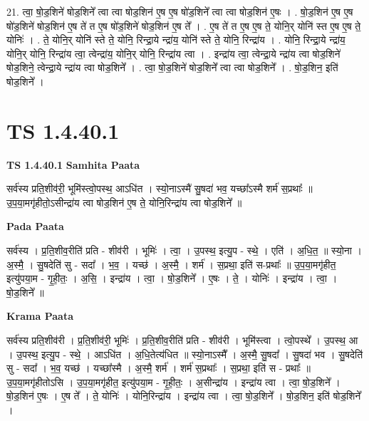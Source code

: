 \documentclass[17pt]{extarticle}
\begin{document}
21. त्वा॒ षो॒ड॒शिने॑ षोड॒शिने᳚ त्वा त्वा षोड॒शिन॑ ए॒ष ए॒ष षो॑ड॒शिने᳚ त्वा त्वा षोड॒शिन॑ ए॒षः । . षो॒ड॒शिन॑ ए॒ष ए॒ष षो॑ड॒शिने॑ षोड॒शिन॑ ए॒ष ते॑ त ए॒ष षो॑ड॒शिने॑ षोड॒शिन॑ ए॒ष ते᳚ । . ए॒ष ते॑ त ए॒ष ए॒ष ते॒ योनि॒र् योनि॑ स्त ए॒ष ए॒ष ते॒ योनिः॑ । . ते॒ योनि॒र् योनि॑ स्ते ते॒ योनि॒ रिन्द्रा॒ये न्द्रा॑य॒ योनि॑ स्ते ते॒ योनि॒ रिन्द्रा॑य । . योनि॒ रिन्द्रा॒ये न्द्रा॑य॒ योनि॒र् योनि॒ रिन्द्रा॑य त्वा॒ त्वेन्द्रा॑य॒ योनि॒र् योनि॒ रिन्द्रा॑य त्वा । . इन्द्रा॑य त्वा॒ त्वेन्द्रा॒ये न्द्रा॑य त्वा षोड॒शिने॑ षोड॒शिने॒ त्वेन्द्रा॒ये न्द्रा॑य त्वा षोड॒शिने᳚ । . त्वा॒ षो॒ड॒शिने॑ षोड॒शिने᳚ त्वा त्वा षोड॒शिने᳚ । . षो॒ड॒शिन॒ इति॑ षोड॒शिने᳚ । \newline
\pagebreak
{}
\section*{ TS 1.4.40.1 }

\textbf{TS 1.4.40.1 } \newline
\textbf{Samhita Paata} \newline

सर्व॑स्य प्रति॒शीव॑री॒ भूमि॑स्त्वो॒पस्थ॒ आऽधि॑त । स्यो॒नाऽस्मै॑ सु॒षदा॑ भव॒ यच्छा᳚ऽस्मै शर्म॑ स॒प्रथाः᳚ ॥ उ॒प॒या॒मगृ॑हीतो॒ऽसीन्द्रा॑य त्वा षोड॒शिन॑ ए॒ष ते॒ योनि॒रिन्द्रा॑य त्वा षोड॒शिने᳚ ॥ \newline

\textbf{Pada Paata} \newline

सर्व॑स्य । प्र॒ति॒शीव॒रीति॑ प्रति - शीव॑री । भूमिः॑ । त्वा॒ । उ॒पस्थ॒ इत्यु॒प - स्थे॒ । एति॑ । अ॒धि॒त॒ ॥ स्यो॒ना । अ॒स्मै॒ । सु॒षदेति॑ सु - सदा᳚ । भ॒व॒ । यच्छ॑ । अ॒स्मै॒ । शर्म॑ । स॒प्रथा॒ इति॑ स-प्रथाः᳚ ॥ उ॒प॒या॒मगृ॑हीत॒ इत्यु॑पया॒म - गृ॒ही॒तः॒ । अ॒सि॒ । इन्द्रा॑य । त्वा॒ । षो॒ड॒शिने᳚ । ए॒षः । ते॒ । योनिः॑ । इन्द्रा॑य । त्वा॒ । षो॒ड॒शिने᳚ ॥  \newline


\textbf{Krama Paata} \newline

सर्व॑स्य प्रति॒शीव॑री । प्र॒ति॒शीव॑री॒ भूमिः॑ । प्र॒ति॒शीव॒रीति॑ प्रति - शीव॑री । भूमि॑स्त्वा । त्वो॒पस्थे᳚ । उ॒पस्थ॒ आ । उ॒पस्थ॒ इत्यु॒प - स्थे॒ । आऽधि॑त । अ॒धि॒तेत्य॑धित ॥ स्यो॒नाऽस्मै᳚ । अ॒स्मै॒ सु॒षदा᳚ । सु॒षदा॑ भव । सु॒षदेति॑ सु - सदा᳚ । भ॒व॒ यच्छ॑ । यच्छा᳚स्मै । अ॒स्मै॒ शर्म॑ । शर्म॑ स॒प्रथाः᳚ । स॒प्रथा॒ इति॑ स - प्रथाः᳚ ॥ उ॒प॒या॒मगृ॑हीतोऽसि । उ॒प॒या॒मगृ॑हीत॒ इत्यु॑पया॒म - गृ॒ही॒तः॒ । अ॒सीन्द्रा॑य । इन्द्रा॑य त्वा । त्वा॒ षो॒ड॒शिने᳚ । षो॒ड॒शिन॑ ए॒षः । ए॒ष ते᳚ । ते॒ योनिः॑ । योनि॒रिन्द्रा॑य । इन्द्रा॑य त्वा । त्वा॒ षो॒ड॒शिने᳚ । षो॒ड॒शिन॒ इति॑ षोड॒शिने᳚ । \newline
\end{document}
